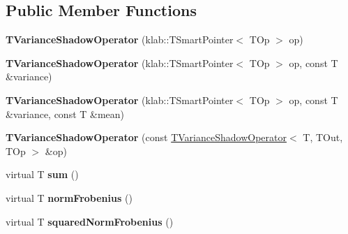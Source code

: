 \subsection*{Public Member Functions}
\begin{DoxyCompactItemize}
\item 
{\bfseries T\+Variance\+Shadow\+Operator} (klab\+::\+T\+Smart\+Pointer$<$ T\+Op $>$ op)\hypertarget{classkl1p_1_1TVarianceShadowOperator_aeaedcca5e33fb011e510d68250f7b509}{}\label{classkl1p_1_1TVarianceShadowOperator_aeaedcca5e33fb011e510d68250f7b509}

\item 
{\bfseries T\+Variance\+Shadow\+Operator} (klab\+::\+T\+Smart\+Pointer$<$ T\+Op $>$ op, const T \&variance)\hypertarget{classkl1p_1_1TVarianceShadowOperator_a92f8001e0ae9288f664103ab912f52ea}{}\label{classkl1p_1_1TVarianceShadowOperator_a92f8001e0ae9288f664103ab912f52ea}

\item 
{\bfseries T\+Variance\+Shadow\+Operator} (klab\+::\+T\+Smart\+Pointer$<$ T\+Op $>$ op, const T \&variance, const T \&mean)\hypertarget{classkl1p_1_1TVarianceShadowOperator_a7f2bf815a1ae1ad8110a1fda3d904da1}{}\label{classkl1p_1_1TVarianceShadowOperator_a7f2bf815a1ae1ad8110a1fda3d904da1}

\item 
{\bfseries T\+Variance\+Shadow\+Operator} (const \hyperlink{classkl1p_1_1TVarianceShadowOperator}{T\+Variance\+Shadow\+Operator}$<$ T, T\+Out, T\+Op $>$ \&op)\hypertarget{classkl1p_1_1TVarianceShadowOperator_ad4652af8788fed2a4393be0d1bf7fe6e}{}\label{classkl1p_1_1TVarianceShadowOperator_ad4652af8788fed2a4393be0d1bf7fe6e}

\item 
virtual T {\bfseries sum} ()\hypertarget{classkl1p_1_1TVarianceShadowOperator_a8f64ab36fc02f87519c859f2c5f00728}{}\label{classkl1p_1_1TVarianceShadowOperator_a8f64ab36fc02f87519c859f2c5f00728}

\item 
virtual T {\bfseries norm\+Frobenius} ()\hypertarget{classkl1p_1_1TVarianceShadowOperator_a2cf68fa9ec2602c18d6c5183e4c3753e}{}\label{classkl1p_1_1TVarianceShadowOperator_a2cf68fa9ec2602c18d6c5183e4c3753e}

\item 
virtual T {\bfseries squared\+Norm\+Frobenius} ()\hypertarget{classkl1p_1_1TVarianceShadowOperator_a41717829d74c1a9aec57615083bec254}{}\label{classkl1p_1_1TVarianceShadowOperator_a41717829d74c1a9aec57615083bec254}


\end{DoxyCompactItemize}

